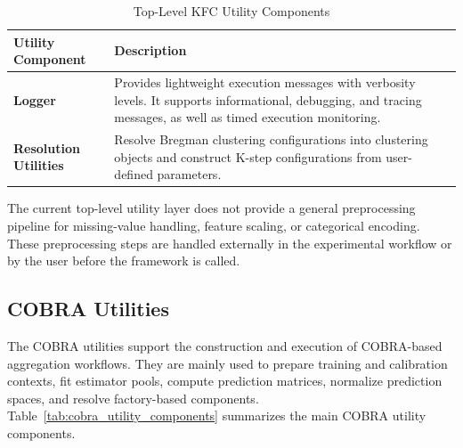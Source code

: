 \begin{table}[H]
      \centering
      \caption{Top-Level KFC Utility Components}
      \label{tab:kfc_top_level_utilities}
      \begin{tabularx}{\textwidth}{
                  >{\raggedright\arraybackslash}p{3.5cm}
                  >{\raggedright\arraybackslash}X
            }
            \toprule
            \textbf{Utility Component}    & \textbf{Description}                                                                                                              \\
            \midrule
            \textbf{Logger}               &
            Provides lightweight execution messages with verbosity levels. It supports informational, debugging, and tracing messages, as well as timed execution monitoring. \\

            \textbf{Resolution Utilities} &
            Resolve Bregman clustering configurations into clustering objects and construct K-step configurations from user-defined parameters.                               \\
            \bottomrule
      \end{tabularx}
\end{table}

The current top-level utility layer does not provide a general preprocessing pipeline for missing-value handling, feature scaling, or categorical encoding. These preprocessing steps are handled externally in the experimental workflow or by the user before the framework is called.

\subsection{COBRA Utilities}

The COBRA utilities support the construction and execution of COBRA-based aggregation workflows. They are mainly used to prepare training and calibration contexts, fit estimator pools, compute prediction matrices, normalize prediction spaces, and resolve factory-based components. Table~\ref{tab:cobra_utility_components} summarizes the main COBRA utility components.

